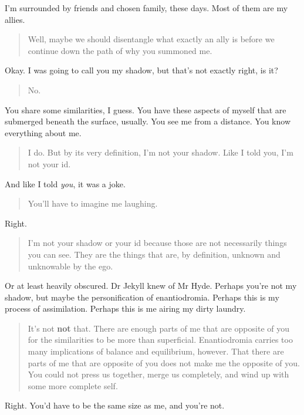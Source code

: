 I'm surrounded by friends and chosen family, these days. Most of them are my allies.

\begin{quote}
Well, maybe we should disentangle what exactly an ally is before we continue down the path of why you summoned me.
\end{quote}

Okay. I was going to call you my shadow, but that's not exactly right, is it?

\begin{quote}
No.
\end{quote}

You share some similarities, I guess. You have these aspects of myself that are submerged beneath the surface, usually. You see me from a distance. You know everything about me.

\begin{quote}
I do. But by its very definition, I'm not your shadow. Like I told you, I'm not your id.
\end{quote}

And like I told \emph{you}, it was a joke.

\begin{quote}
You'll have to imagine me laughing.
\end{quote}

Right.

\begin{quote}
I'm not your shadow or your id because those are not necessarily things you can see. They are the things that are, by definition, unknown and unknowable by the ego.
\end{quote}

Or at least heavily obscured. Dr Jekyll knew of Mr Hyde. Perhaps you're not my shadow, but maybe the personification of enantiodromia. Perhaps this is my process of assimilation. Perhaps this is me airing my dirty laundry.

\begin{quote}
It's not \textbf{not} that. There are enough parts of me that are opposite of you for the similarities to be more than superficial. Enantiodromia carries too many implications of balance and equilibrium, however. That there are parts of me that are opposite of you does not make me the opposite of you. You could not press us together, merge us completely, and wind up with some more complete self.
\end{quote}

Right. You'd have to be the same size as me, and you're not.

